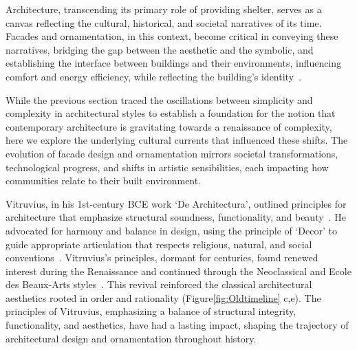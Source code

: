 


Architecture, transcending its primary role of providing shelter, serves as a canvas reflecting the cultural, historical, and societal narratives of its time.
Facades and ornamentation, in this context, become critical in conveying these narratives, bridging the gap between the aesthetic and the symbolic, and establishing the interface between buildings and their environments, influencing comfort and energy efficiency, while reflecting the building's identity~\cite{Kamal2020}.

While the previous section traced the oscillations between simplicity and complexity in architectural styles to establish a foundation for the notion that contemporary architecture is gravitating towards a renaissance of complexity, here we explore the underlying cultural currents that influenced these shifts.
The evolution of facade design and ornamentation mirrors societal transformations, technological progress, and shifts in artistic sensibilities, each impacting how communities relate to their built environment.


Vitruvius, in his 1st-century BCE work `De Architectura', outlined principles for architecture that emphasize structural soundness, functionality, and beauty~\cite{Ostwald2023}.
He advocated for harmony and balance in design, using the principle of `Decor' to guide appropriate articulation that respects religious, natural, and social conventions~\cite{Lefas2000}.
Vitruvius's principles, dormant for centuries, found renewed interest during the Renaissance and continued through the Neoclassical and Ecole des Beaux-Arts styles~\cite{Wikipedia2023}.
This revival reinforced the classical architectural aesthetics rooted in order and rationality (Figure\ref{fig:Oldtimeline} c,e).
The principles of Vitruvius, emphasizing a balance of structural integrity, functionality, and aesthetics, have had a lasting impact, shaping the trajectory of architectural design and ornamentation throughout history.


